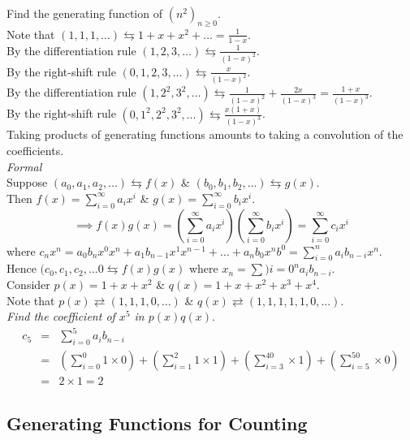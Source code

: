 \documentclass[11pt,a4paper]{article}
\begin{document}
Find the generating function of $(n^2)_{n\geq0}$.\\
Note that $(1,1,1,\dots)\leftrightarrows 1+x+x^2+\dots=\frac{1}{1-x}$.\\
By the differentiation rule $(1,2,3,\dots)\leftrightarrows\frac{1}{(1-x)^2}$.\\
By the right-shift rule $(0,1,2,3,\dots)\leftrightarrows\frac{x}{(1-x)^2}$.\\
By the differentiation rule $(1,2^2,3^2,\dots)\leftrightarrows\frac{1}{(1-x)^2}+\frac{2x}{(1-x)^3}=\frac{1+x}{(1-x)^3}$.\\
By the right-shift rule $(0,1^2,2^2,3^2,\dots)\leftrightarrows\frac{x(1+x)}{(1-x)^3}$.\\

Taking products of generating functions amounts to taking a convolution of the coefficients.\\
\textit{Formal}\\
Suppose $(a_0,a_1,a_2,\dots)\leftrightarrows f(x)$ \& $(b_0,b_1,b_2,\dots)\leftrightarrows g(x)$.\\
Then $f(x)=\sum_{i=0}^\infty a_ix^i$ \& $g(x)=\sum_{i=0}^\infty b_ix^i$.
$$\implies f(x)g(x)=\left(\sum_{i=0}^\infty a_ix^i\right)\left(\sum_{i=0}^\infty b_ix^i\right)=\sum_{i=0}^\infty c_ix^i$$
where $c_nx^n=a_0b_nx^0x^n+a_1b_{n-1}x^1x^{n-1}+\dots+a_nb_0x^nb^0=\sum_{i=0}^n a_ib_{n-i}x^n$.
Hence $(c_0,c_1,c_2,\dots0\leftrightarrows f(x)g(x)$ where $x_n=\sum){i=0}^n a_ib_{n-i}$.\\

Consider $p(x)=1+x+x^2$ \& $q(x)=1+x+x^2+x^3+x^4$.\\
Note that $p(x)\rightleftarrows(1,1,1,0,\dots)$ \& $q(x)\rightleftarrows(1,1,1,1,1,0,\dots)$.\\
\textit{Find the coefficient of $x^5$ in $p(x)q(x)$}.
\[\begin{array}{rcl}
c_5&=&\sum\limits_{i=0}^5a_ib_{n-i}\\
&=&\left(\sum\limits_{i=0}^0 1\times0\right)+\left(\sum\limits_{i=1}^2 1\times1\right)+\left(\sum\limits_{i=3}^40\times1\right)+\left(\sum\limits_{i=5}^50\times0\right)\\
&=&2\times1=2
\end{array}\]

\subsection{Generating Functions for Counting}
\end{document}
